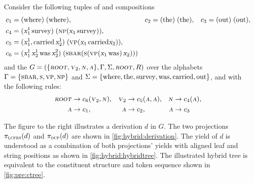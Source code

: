 \documentclass[../../document.tex]{subfiles}
\begin{document}
    \begin{example}\label{ex:hg:derivation}
        Consider the following tuples of  and  compositions
        \begin{align*}
            c_1 &= (\tn{where})\;(\tn{where}),
            &c_2 &= (\tn{the})\;(\tn{the}),
            &c_3 &= (\tn{out})\;(\tn{out}), \\
%
            c_4 &= (\x_1^1\, \tn{survey})\;(\cn{np} (\x_1 \, \tn{survey})), \\
            c_5 &= (\x_1^1, \tn{carried}\,\x_2^1)\;(\cn{vp}(\x_1 \, \tn{carried} \x_2)), \\
            c_6 &= (\x_1^1\,\x_2^1\,\tn{was}\,\x_2^2)\;(\cn{sbar} (\cn{s} (\cn{vp} (\x_1\, \tn{was})\,\x_2)))
        \end{align*}
        and the  \(G= (\{\textsc{\textsl{root}}, \textsc{\textsl{v}}_2, \textsc{\textsl{n}}, \textsc{\textsl{a}}\}, \Gamma, \Sigma, \textsc{\textsl{root}}, R)\) over the alphabets \(\Gamma = \{\textsc{sbar}, \textsc{s}, \textsc{vp}, \textsc{np}\}\) and \(\Sigma = \{\text{where}, \text{the}, \text{survey}, \text{was}, \text{carried}, \text{out}\}\), and with the following rules:
        \begin{align*}
            \textsc{\textsl{root}} &\to c_6 (\textsc{\textsl{v}}_2, \textsc{\textsl{n}}), & \textsc{\textsl{v}}_2 &\to c_5 (\textsc{\textsl{a}}, \textsc{\textsl{a}}), & \textsc{\textsl{n}} &\to c_4 (\textsc{\textsl{a}}), \\
            \textsc{\textsl{a}} &\to c_1, & \textsc{\textsl{a}} &\to c_2, & \textsc{\textsl{a}} &\to c_3
        \end{align*}

        \noindent
        \begin{minipage}[t]{.65\linewidth}
            The figure to the right illustrates a derivation \(d\) in \(G\).
            The two projections \(\pi_{\textsc{lcfrs}}(d)\) and \(\pi_{\textsc{dcp}}(d)\) are shown in \cref{fig:hybrid:derivation}.
            The yield of \(d\) is understood as a combination of both projections' yields with aligned leaf and string positions as shown in \cref{fig:hybrid:hybridtree}.
            The illustrated hybrid tree is equivalent to the constituent structure and token sequence shown in \cref{fig:pre:ctree}.
        \end{minipage}
        \hfill
    \end{example}
\end{document}
